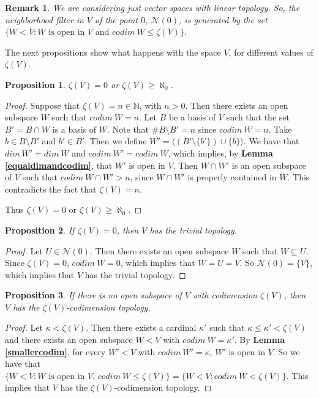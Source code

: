 \documentclass[a4paper,12pt]{article}
\newcommand{\N}{\mathbb{N}}
\newtheorem{prop}{Proposition}[section]
\newtheorem{obs}{Remark}[section]
\theoremstyle{bloco}
\begin{document}
\begin{obs} We are considering just vector spaces with linear topology. So, the neighborhood filter in $V$ of the point $0$, $\mathcal{N}(0)$, is generated by the set $\{W < V: W \text{ is open in $V$ and } codim \ W \leqslant \zeta(V) \}$.
\end{obs}

The next propositions show what happens with the space $V$, for different values of $\zeta(V)$.

\begin{prop}\label{zetaisnotfinite} $\zeta(V) = 0$ or $\zeta(V) \geqslant \aleph_{0}$.
\end{prop}

\begin{proof}Suppose that $\zeta(V) = n \in \N$, with $n > 0$. Then there exists an open subspace $W$ such that $codim \ W = n$. Let $B$ be a basis of $V$ such that the set $B' = B \cap W$ is a basis of $W$. Note that $\# B \setminus B' = n$ since $codim \ W = n$. Take $b \in B \setminus B'$ and $b' \in B'$. Then we define $W' = \langle (B' \setminus \{b'\}) \cup \{b\} \rangle$. We have that $dim \ W' = dim \ W$ and $codim \ W' = codim \ W$, which implies, by \textbf{Lemma \ref{equaldimandcodim}}, that $W'$ is open in $V$. Then $W \cap W'$ is an open subspace of $V$ such that $codim \ W \cap W' > n$, since $W \cap W'$ is properly contained in $W$. This contradicts the fact that  $\zeta(V) = n$.

Thus $\zeta(V) = 0$ or $\zeta(V) \geqslant \aleph_{0}$.
\end{proof}

\begin{prop}\label{codimensionone}If $\zeta(V) = 0$, then $V$ has the trivial topology.  
\end{prop}

\begin{proof} Let $U \in \mathcal{N}(0)$. Then there exists an open subspace $W$ such that $W \subseteq U$. Since $\zeta(V) = 0$, $codim \ W = 0$, which implies that $W = U = V$. So $\mathcal{N}(0) = \{V\}$, which implies that $V$ has the trivial topology.
\end{proof}

\begin{prop}\label{supisnotmax}If there is no open subspace  of $V$ with codimension $\zeta(V)$, then $V$ has the $\zeta(V)$-codimension topology.
\end{prop}

\begin{proof}Let $\kappa < \zeta(V)$. Then there exists a cardinal $\kappa'$ such that $\kappa \leqslant \kappa' < \zeta(V)$ and there exists an open subspace $W < V$ with $codim \ W = \kappa'$. By \textbf{Lemma \ref{smallercodim}}, for every $W' < V$ with $codim \ W' = \kappa$, $W'$ is open in $V$. So we have that 
${\{W \! < \! V: W \text{ is open in $V$, } codim \ W \leqslant \zeta(V) \} \! = \! \{W \!< \!V: codim \ W < \zeta(V) \}}$. This implies that $V$ has the $\zeta(V)$-codimension topology.
\end{proof}
\end{document}
